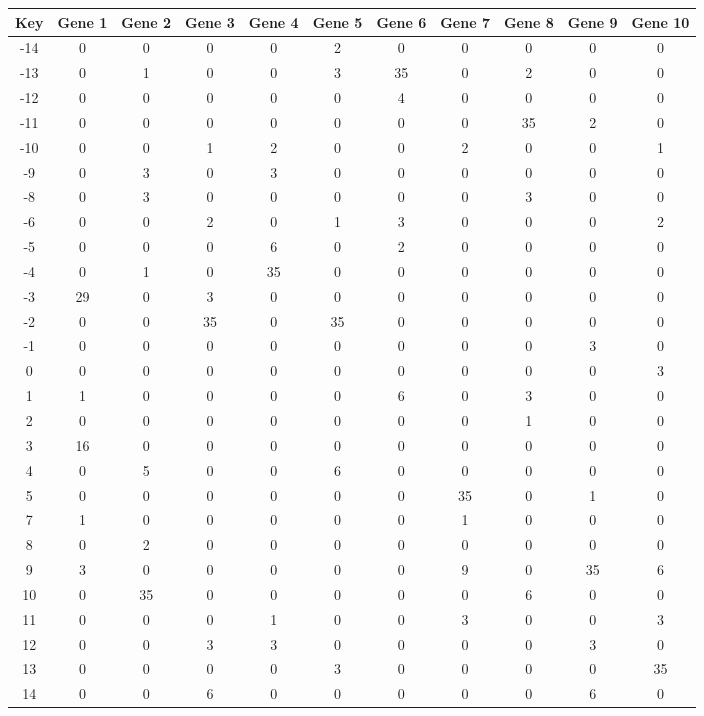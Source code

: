 \begin{tabular}{|c|c|c|c|c|c|c|c|c|c|c|}
\hline
Key & Gene 1 & Gene 2 & Gene 3 & Gene 4 & Gene 5 & Gene 6 & Gene 7 & Gene 8 & Gene 9 & Gene 10 \\
\hline
-14 & 0 & 0 & 0 & 0 & 2 & 0 & 0 & 0 & 0 & 0 \\
-13 & 0 & 1 & 0 & 0 & 3 & 35 & 0 & 2 & 0 & 0 \\
-12 & 0 & 0 & 0 & 0 & 0 & 4 & 0 & 0 & 0 & 0 \\
-11 & 0 & 0 & 0 & 0 & 0 & 0 & 0 & 35 & 2 & 0 \\
-10 & 0 & 0 & 1 & 2 & 0 & 0 & 2 & 0 & 0 & 1 \\
-9 & 0 & 3 & 0 & 3 & 0 & 0 & 0 & 0 & 0 & 0 \\
-8 & 0 & 3 & 0 & 0 & 0 & 0 & 0 & 3 & 0 & 0 \\
-6 & 0 & 0 & 2 & 0 & 1 & 3 & 0 & 0 & 0 & 2 \\
-5 & 0 & 0 & 0 & 6 & 0 & 2 & 0 & 0 & 0 & 0 \\
-4 & 0 & 1 & 0 & 35 & 0 & 0 & 0 & 0 & 0 & 0 \\
-3 & 29 & 0 & 3 & 0 & 0 & 0 & 0 & 0 & 0 & 0 \\
-2 & 0 & 0 & 35 & 0 & 35 & 0 & 0 & 0 & 0 & 0 \\
-1 & 0 & 0 & 0 & 0 & 0 & 0 & 0 & 0 & 3 & 0 \\
0 & 0 & 0 & 0 & 0 & 0 & 0 & 0 & 0 & 0 & 3 \\
1 & 1 & 0 & 0 & 0 & 0 & 6 & 0 & 3 & 0 & 0 \\
2 & 0 & 0 & 0 & 0 & 0 & 0 & 0 & 1 & 0 & 0 \\
3 & 16 & 0 & 0 & 0 & 0 & 0 & 0 & 0 & 0 & 0 \\
4 & 0 & 5 & 0 & 0 & 6 & 0 & 0 & 0 & 0 & 0 \\
5 & 0 & 0 & 0 & 0 & 0 & 0 & 35 & 0 & 1 & 0 \\
7 & 1 & 0 & 0 & 0 & 0 & 0 & 1 & 0 & 0 & 0 \\
8 & 0 & 2 & 0 & 0 & 0 & 0 & 0 & 0 & 0 & 0 \\
9 & 3 & 0 & 0 & 0 & 0 & 0 & 9 & 0 & 35 & 6 \\
10 & 0 & 35 & 0 & 0 & 0 & 0 & 0 & 6 & 0 & 0 \\
11 & 0 & 0 & 0 & 1 & 0 & 0 & 3 & 0 & 0 & 3 \\
12 & 0 & 0 & 3 & 3 & 0 & 0 & 0 & 0 & 3 & 0 \\
13 & 0 & 0 & 0 & 0 & 3 & 0 & 0 & 0 & 0 & 35 \\
14 & 0 & 0 & 6 & 0 & 0 & 0 & 0 & 0 & 6 & 0 \\
\hline
\end{tabular}